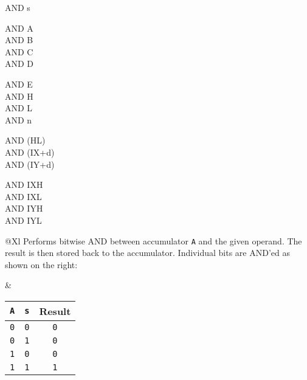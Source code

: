 \begin{basedescript}{
	\desclabelstyle{\multilinelabel}
	\desclabelwidth{3cm}}
\begin{DetailItem}{AND s}
		\begin{DetailVariants}[4]
			AND A\\
			AND B\\
			AND C\\
			AND D

			\columnbreak
			AND E\\
			AND H\\
			AND L\\
			AND n
			
			\columnbreak
			AND (HL)\\
			AND (IX+d)\\
			AND (IY+d)

			\columnbreak
			AND IXH\UNDOC\\
			AND IXL\UNDOC\\
			AND IYH\UNDOC\\
			AND IYL\UNDOC
		\end{DetailVariants}

		\begin{tabularx}{\linewidth}{@{}Xl}
			Performs bitwise AND between accumulator {\tt A} and the given operand. The result is then stored back to the accumulator. Individual bits are AND'ed as shown on the right:

			&

			\begin{tabular}[t]{cc|c}
				{\tt A} & {\tt s} & Result \\
				\hline
				{\tt 0} & {\tt 0} & {\tt 0} \\
				{\tt 0} & {\tt 1} & {\tt 0} \\
				{\tt 1} & {\tt 0} & {\tt 0} \\
				{\tt 1} & {\tt 1} & {\tt 1} \\
			\end{tabular}

			\\
		\end{tabularx}

		\begin{DetailEffects}[p]
			\FlagsANDr
		\end{DetailEffects}

		\begin{DetailTiming}
		\end{DetailTiming}

	\end{DetailItem}


\end{basedescript}
